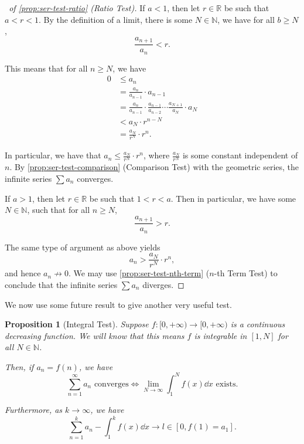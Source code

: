 \documentclass[11pt]{article}
\numberwithin{equation}{section}
\newtheorem{proposition}[theorem]{Proposition}
\theoremstyle{definition}
\theoremstyle{remark}
\newcommand{\pqty}[1]{\left(#1\right)}
\newcommand{\ccintv}[2]{[#1,#2]}
\newcommand{\cointv}[2]{[#1,#2)}
\newcommand{\functiondomain}[3]{#1:#2\to #3}
\newcommand{\RR}{\mathbb R}
\newcommand{\NN}{\mathbb N}
\newcommand{\plusinfty}{+\infty}
\newcommand{\notto}{\not\to}
\begin{document}
\begin{proof}[\proofname\ of \autoref{prop:ser-test-ratio} (Ratio Test)]
    If \(a < 1\), then let \(r \in \RR\) be such that \(a < r < 1\). By the definition of a limit, there is some \(N \in \NN\), we have for all \(b \geq N\),
    \[
        \frac{a_{n + 1}}{a_n} < r.
    \]
    
    This means that for all \(n \geq N\), we have
    \begin{align*}
        0 &\leq a_n \\
          &= \frac{a_n}{a_{n - 1}} \cdot a_{n - 1} \\
          &= \frac{a_n}{a_{n - 1}} \cdot \frac{a_{n - 1}}{a_{n - 2}} \cdots \frac{a_{N + 1}}{a_N} \cdot a_{N} \\
          &< a_N \cdot r^{n - N} \\
          &= \frac{a_N}{r^N} \cdot r^n.
    \end{align*}

    In particular, we have that \(a_n \leq \frac{a_N}{r^N} \cdot r^n\), where \(\frac{a_N}{r^N}\) is some constant independent of \(n\). By \autoref{prop:ser-test-comparison} (Comparison Test) with the geometric series, the infinite series \(\sum a_n\) converges.

    If \(a > 1\), then let \(r \in \RR\) be such that \(1 < r < a\). Then in particular, we have some \(N \in \NN\), such that for all \(n \geq N\),
    \[
        \frac{a_{n + 1}}{a_n} > r.
    \]
    
    The same type of argument as above yields
    \[
        a_n > \frac{a_N}{r^N} \cdot r^n,
    \]
    and hence \(a_n \notto 0\). We may use \autoref{prop:ser-test-nth-term} (\(n\)-th Term Test) to conclude that the infinite series \(\sum a_n\) diverges.
\end{proof}

We now use some future result to give another very useful test.

\begin{proposition}[Integral Test]\label{analysis-unit-0048}
    \label{prop:ser-test-integral}%
    Suppose \(\functiondomain{f}{\cointv{0}{\plusinfty}}{\cointv{0}{\plusinfty}}\) is a continuous decreasing function. We will know that this means \(f\) is integrable in \(\ccintv{1}{N}\) for all \(N \in \NN\).

    Then, if \(a_n = f\pqty{n}\), we have
    \[
        \sum_{n = 1}^{\infty} a_n \text{ converges} \iff \lim_{N \to \infty} \int_{1}^{N} f\pqty{x} \dd{x} \text{ exists}.
    \]

    Furthermore, as \(k \to \infty\), we have
    \[
        \sum_{n = 1}^{k} a_n - \int_{1}^{k} f\pqty{x} \dd{x} \to l \in \ccintv{0}{f\pqty{1} = a_1}.
    \]
\end{proposition}
\end{document}

